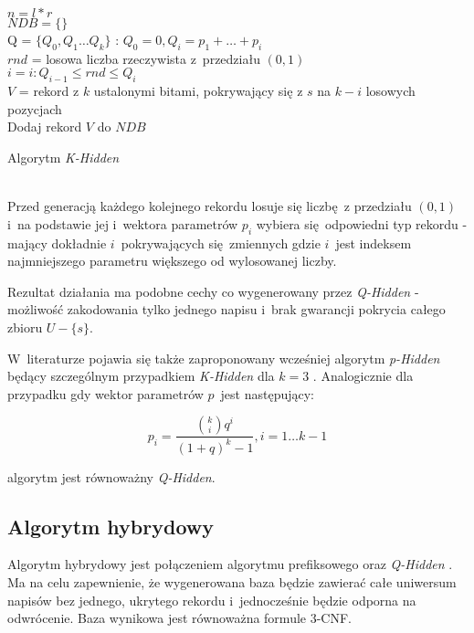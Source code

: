  \begin{algorithm}[H]
    \SetAlgoLined
    
    $n = l * r$\\
    $NDB = \{\}$\\
    Q = $\{Q_0, Q_1 \dots Q_k \}$ : $Q_0 = 0, Q_i = p_1 + \dots + p_i $\\
    {
        $rnd$ = losowa liczba rzeczywista z~przedziału $(0,1)$\\
        $i = i : Q_{i-1} \le rnd \le Q_i$\\
        $V$ = rekord z $k$ ustalonymi bitami, pokrywający się z $s$ na $k-i$ losowych pozycjach\\
        Dodaj rekord $V$ do $NDB$
    } 
    \caption{Algorytm \textit{K-Hidden}}
    \label{alg:khidden}
\end{algorithm}
~\\
Przed generacją każdego kolejnego rekordu losuje się liczbę z przedziału $(0,1)$ i~na podstawie jej i~wektora parametrów $p_i$ wybiera
się odpowiedni typ rekordu - mający dokładnie $i$~pokrywających się zmiennych gdzie $i$~jest indeksem najmniejszego parametru większego
od wylosowanej liczby.

Rezultat działania ma podobne cechy co wygenerowany przez \textit{Q-Hidden} - możliwość zakodowania tylko
jednego napisu i~brak gwarancji pokrycia całego zbioru $U - \{s\}$.

W~literaturze pojawia się także zaproponowany wcześniej algorytm \textit{p-Hidden} będący szczególnym przypadkiem \textit{K-Hidden} dla $k=3$ \cite{p-hidden}.
Analogicznie dla przypadku gdy wektor parametrów $p$~jest następujący:

\[ p_i = \frac{{{k}\choose{i}}q^i}{(1+ q)^k - 1}, i = 1 \dots k-1   \]

algorytm jest równoważny \textit{Q-Hidden}. \cite{k-hidden}

\subsection{Algorytm hybrydowy}
Algorytm hybrydowy jest połączeniem algorytmu prefiksowego oraz \textit{Q-Hidden} \cite{hybrid}. 
Ma na celu zapewnienie, że wygenerowana baza będzie zawierać całe uniwersum napisów bez jednego, ukrytego rekordu i~jednocześnie
będzie odporna na odwrócenie.  Baza wynikowa jest równoważna formule 3-CNF.

